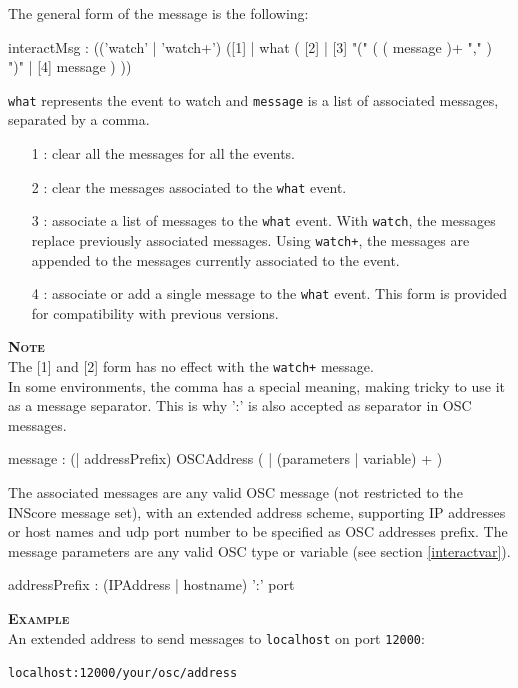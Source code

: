 \documentclass[a4paper,twoside]{report}
\newcommand{\OSC}[1]		{\texttt{#1}}
\newcommand{\example}		{\textbf{\hspace{-1.5cm}\textbf{\textsc{Example }}}}
\newcommand{\note}	[1]		{\vspace{2mm}\textbf{\hspace{-1.03cm}\textbf{\textsc{Note #1}}}}
\newcommand{\sample}	[1]			{\vspace{-2mm}\begin{center}\colorbox{mygrey}{
								\begin{minipage}[t]{0.9\columnwidth} 
								{\small \texttt{#1}}
								\end{minipage}}\end{center}}
\begin{document}
The general form of the message is the following:
\begin{rail}
interactMsg : (('watch' | 'watch+')  ([1] | 
					what  ( [2] 
							| [3] "(" ( ( message  )+ "," ) ")" 
							| [4] message )  )) 
\end{rail}

\OSC{what} represents the event to watch and \OSC{message} is a list of associated messages, separated by a comma. 

\begin{itemize}
\item [1]: clear all the messages for all the events.
\item [2]: clear the messages associated to the \OSC{what} event.
\item [3]: associate a list of messages to the \OSC{what} event. With \OSC{watch}, the messages replace previously associated messages. Using \OSC{watch+}, the messages are appended to the messages currently associated to the event.
\item [4]: associate or add a single message to the \OSC{what} event. This form is provided for compatibility with previous versions.
\end{itemize}

\note{} \\
	The [1] and [2] form has no effect with the \OSC{watch+} message. \\
	In some environments, the comma has a special meaning, making tricky to use it as a message separator. This is why ':' is also accepted as separator in OSC messages.

\begin{rail} 
message : (| addressPrefix)  OSCAddress ( | (parameters | variable) + )
\end{rail}

The associated messages are any valid OSC message (not restricted to the INScore message set), with an extended address scheme, supporting IP addresses or host names and udp port number to be specified as OSC addresses prefix. The message parameters are any valid OSC type or variable (see section \ref{interactvar}).


\begin{rail} 
addressPrefix : (IPAddress | hostname) ':' port
\end{rail}

\example \\
An extended address to send messages to \OSC{localhost} on port \OSC{12000}:
\sample{localhost:12000/your/osc/address}
\end{document}
